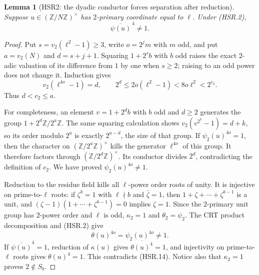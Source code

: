 \documentclass[11pt,a4paper]{article}
\numberwithin{equation}{section}
\newtheorem{lemma}[theorem]{Lemma}
\theoremstyle{remark}\newtheorem{remark}[theorem]{Remark}
\begin{document}
\begin{lemma}[HSR2: the dyadic conductor forces separation after reduction]
\label{claim:HSR2}
Suppose $u\in(\mathbb Z/N\mathbb Z)^\times$ has $2$-primary
coordinate equal to $\ell$.  Under (HSR.2),
\[
                         \overline{\psi(u)}^{\,4}\ne1.
 \tag{HSR.12}
\]
\end{lemma}
\begin{proof}
Put $s=v_2(\ell^2-1)\ge3$, write $o=2^jm$ with $m$ odd, and
put $a=v_2(N)$ and $d=s+j+1$.  Squaring $1+2^sb$ with $b$ odd
raises the exact $2$-adic valuation of its difference from $1$ by
one when $s\ge2$; raising to an odd power does not change it.
Induction gives
\[
 v_2(\ell^{4o}-1)=d,\qquad
 2^d\le2o(\ell^2-1)<8o\ell^2<2^{c_2}.
 \tag{HSR.13}
\]
Thus $d<c_2\le a$.

For completeness, an element $v=1+2^d b$ with $b$ odd and $d\ge2$
generates the group $1+2^d\mathbb Z/2^a\mathbb Z$.
The same squaring calculation shows
$v_2(v^{2^k}-1)=d+k$, so its order modulo $2^a$ is exactly
$2^{a-d}$, the size of that group.  If
$\psi_2(u)^{4o}=1$, then the character on
$(\mathbb Z/2^a\mathbb Z)^\times$ kills the generator
$\ell^{4o}$ of this group.  It therefore factors through
$(\mathbb Z/2^d\mathbb Z)^\times$.  Its conductor divides $2^d$,
contradicting the definition of $c_2$.  We have proved
$\psi_2(u)^{4o}\ne1$.

Reduction to the residue field kills all $\ell$-power order roots
of unity.  It is injective on prime-to-$\ell$ roots: if $\zeta^b=1$
with $\ell\nmid b$ and $\bar\zeta=1$, then
$1+\zeta+\cdots+\zeta^{b-1}$ is a unit, and
$(\zeta-1)(1+\cdots+\zeta^{b-1})=0$ implies $\zeta=1$.
Since the $2$-primary unit group has $2$-power order and $\ell$ is
odd, $\kappa_2=1$ and $\theta_2=\psi_2$.  The CRT product
decomposition and (HSR.2) give
\[
                   \theta(u)^{4o}=\psi_2(u)^{4o}\ne1.
 \tag{HSR.14}
\]
If $\overline{\psi(u)}^4=1$, reduction of $\kappa(u)$ gives
$\overline{\theta(u)^4}=1$, and injectivity on prime-to-$\ell$
roots gives $\theta(u)^4=1$.  This contradicts (HSR.14).
Notice also that $\kappa_2=1$ proves $2\notin S_b$.
\end{proof}
\end{document}
